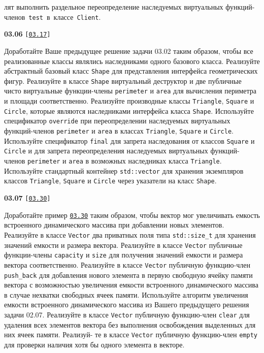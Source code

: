\documentclass[a4paper,12pt]{article}
\begin{document}
лят выполнить раздельное переопределение наследуемых виртуальных функций-членов~\lstinline{test}~в~классе~\lstinline{Client}.

\bigskip

{\large \textbf{03.06} \texttt{[\href{https://github.com/i-s-m-mipt/Education/blob/master/projects/examples/source/03.17.cpp}{\texttt{03.17}}]}}

\bigskip

Доработайте Ваше предыдущее решение задачи 03.02 таким образом, чтобы все реализованные классы являлись наследниками одного базового класса. Реализуйте абстрактный базовый класс \lstinline{Shape} для представления интерфейса геометрических фигур. Реализуйте в классе \lstinline{Shape} виртуальный деструктор и две публичные чисто виртуальные функции-члены \lstinline{perimeter} и \lstinline{area} для вычисления периметра и площади соответственно. Реализуйте производные классы \lstinline{Triangle}, \lstinline{Square} и \lstinline{Circle}, которые являются наследниками интерфейса класса \lstinline{Shape}. Используйте спецификатор \lstinline{override} при переопределении наследуемых виртуальных функций-членов \lstinline{perimeter} и \lstinline{area} в классах \lstinline{Triangle}, \lstinline{Square} и \lstinline{Circle}. Используйте спецификатор \lstinline{final} для запрета наследования от классов \lstinline{Square} и \lstinline{Circle} и для запрета переопределения наследуемых виртуальных функций-членов \lstinline{perimeter} и \lstinline{area} в возможных наследниках класса \lstinline{Triangle}. Используйте стандартный контейнер \lstinline{std::vector} для хранения экземпляров классов \lstinline{Triangle}, \lstinline{Square} и \lstinline{Circle} через указатели на класс \lstinline{Shape}.

\bigskip

{\large \textbf{03.07} \texttt{[\href{https://github.com/i-s-m-mipt/Education/blob/master/projects/examples/source/03.30.cpp}{\texttt{03.30}}]}}

\bigskip

Доработайте пример \href{https://github.com/i-s-m-mipt/Education/blob/master/projects/examples/source/03.30.cpp}{\texttt{03.30}} таким образом, чтобы вектор мог увеличивать емкость встроенного динамического массива при добавлении новых элементов. Реализуйте в классе \lstinline{Vector} два приватных поля типа \lstinline{std::size_t} для хранения значений емкости и размера вектора. Реализуйте в классе \lstinline{Vector} публичные функции-члены \lstinline{capacity} и \lstinline{size} для получения значений емкости и размера вектора соответственно. Реализуйте в классе \lstinline{Vector} публичную функцию-член \lstinline{push_back} для добавления нового элемента в первую свободную ячейку памяти вектора с возможностью увеличения емкости встроенного динамического массива в случае нехватки свободных ячеек памяти. Используйте алгоритм увеличения емкости встроенного динамического массива из Вашего предыдущего решения задачи 02.07. Реализуйте в классе \lstinline{Vector} публичную функцию-член \lstinline{clear} для удаления всех элементов вектора без выполнения освобождения выделенных для них ячеек памяти. Реализуй- те в классе \lstinline{Vector} публичную функцию-член \lstinline{empty} для проверки наличия хотя бы одного элемента в векторе.
\end{document}
